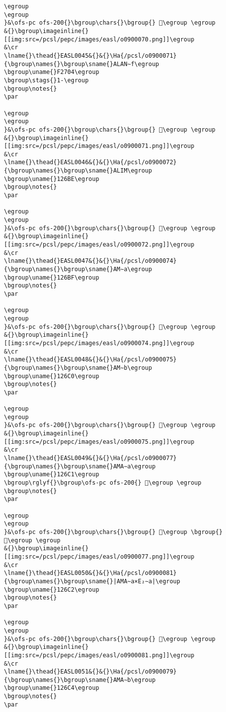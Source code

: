 \begin{verbatim}
\egroup
\egroup
}&\ofs-pc ofs-200{}\bgroup\chars{}\bgroup{} 𒚽\egroup \egroup
&{}\bgroup\imageinline{}[[img:src=/pcsl/pepc/images/easl/o0900070.png]]\egroup
&\cr
\lname{}\thead{}EASL0045&{}&{}\Ha{/pcsl/o0900071}{\bgroup\names{}\bgroup\sname{}ALAN∼f\egroup
\bgroup\uname{}F2704\egroup
\bgroup\stags{}1-\egroup
\bgroup\notes{}
\par 

\egroup
\egroup
}&\ofs-pc ofs-200{}\bgroup\chars{}\bgroup{} 󲜄\egroup \egroup
&{}\bgroup\imageinline{}[[img:src=/pcsl/pepc/images/easl/o0900071.png]]\egroup
&\cr
\lname{}\thead{}EASL0046&{}&{}\Ha{/pcsl/o0900072}{\bgroup\names{}\bgroup\sname{}ALIM\egroup
\bgroup\uname{}126BE\egroup
\bgroup\notes{}
\par 

\egroup
\egroup
}&\ofs-pc ofs-200{}\bgroup\chars{}\bgroup{} 𒚾\egroup \egroup
&{}\bgroup\imageinline{}[[img:src=/pcsl/pepc/images/easl/o0900072.png]]\egroup
&\cr
\lname{}\thead{}EASL0047&{}&{}\Ha{/pcsl/o0900074}{\bgroup\names{}\bgroup\sname{}AM∼a\egroup
\bgroup\uname{}126BF\egroup
\bgroup\notes{}
\par 

\egroup
\egroup
}&\ofs-pc ofs-200{}\bgroup\chars{}\bgroup{} 𒚿\egroup \egroup
&{}\bgroup\imageinline{}[[img:src=/pcsl/pepc/images/easl/o0900074.png]]\egroup
&\cr
\lname{}\thead{}EASL0048&{}&{}\Ha{/pcsl/o0900075}{\bgroup\names{}\bgroup\sname{}AM∼b\egroup
\bgroup\uname{}126C0\egroup
\bgroup\notes{}
\par 

\egroup
\egroup
}&\ofs-pc ofs-200{}\bgroup\chars{}\bgroup{} 𒛀\egroup \egroup
&{}\bgroup\imageinline{}[[img:src=/pcsl/pepc/images/easl/o0900075.png]]\egroup
&\cr
\lname{}\thead{}EASL0049&{}&{}\Ha{/pcsl/o0900077}{\bgroup\names{}\bgroup\sname{}AMA∼a\egroup
\bgroup\uname{}126C1\egroup
\bgroup\rglyf{}\bgroup\ofs-pc ofs-200{} 𒛁\egroup \egroup
\bgroup\notes{}
\par 

\egroup
\egroup
}&\ofs-pc ofs-200{}\bgroup\chars{}\bgroup{} 𒛁\egroup \bgroup{} 𒛃\egroup \egroup
&{}\bgroup\imageinline{}[[img:src=/pcsl/pepc/images/easl/o0900077.png]]\egroup
&\cr
\lname{}\thead{}EASL0050&{}&{}\Ha{/pcsl/o0900081}{\bgroup\names{}\bgroup\sname{}|AMA∼a×E₂∼a|\egroup
\bgroup\uname{}126C2\egroup
\bgroup\notes{}
\par 

\egroup
\egroup
}&\ofs-pc ofs-200{}\bgroup\chars{}\bgroup{} 𒛂\egroup \egroup
&{}\bgroup\imageinline{}[[img:src=/pcsl/pepc/images/easl/o0900081.png]]\egroup
&\cr
\lname{}\thead{}EASL0051&{}&{}\Ha{/pcsl/o0900079}{\bgroup\names{}\bgroup\sname{}AMA∼b\egroup
\bgroup\uname{}126C4\egroup
\bgroup\notes{}
\par 


\end{verbatim}
